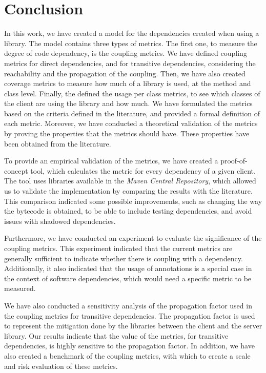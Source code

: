 \chapter{Conclusion}\label{ch:Conclusion}

In this work, we have created a model for the dependencies created when using a library. The model contains three types of metrics. The first one, to measure the degree of code dependency, is the coupling metrics. We have defined coupling metrics for direct dependencies, and for transitive dependencies, considering the reachability and the propagation of the coupling. Then, we have also created coverage metrics to measure how much of a library is used, at the method and class level. Finally, the defined the usage per class metrics, to see which classes of the client are using the library and how much. We have formulated the metrics based on the criteria defined in the literature, and provided a formal definition of each metric. Moreover, we have conducted a theoretical validation of the metrics by proving the properties that the metrics should have. These properties have been obtained from the literature.

To provide an empirical validation of the metrics, we have created a proof-of-concept tool, which calculates the metric for every dependency of a given client. The tool uses libraries available in the \textit{Maven Central Repository}, which allowed us to validate the implementation by comparing the results with the literature. This comparison indicated some possible improvements, such as changing the way the bytecode is obtained, to be able to include testing dependencies, and avoid issues with shadowed dependencies.

Furthermore, we have conducted an experiment to evaluate the significance of the coupling metrics. This experiment indicated that the current metrics are generally sufficient to indicate whether there is coupling with a dependency. Additionally, it also indicated that the usage of annotations is a special case in the context of software dependencies, which would need a specific metric to be measured.

We have also conducted a sensitivity analysis of the propagation factor used in the coupling metrics for transitive dependencies. The propagation factor is used to represent the mitigation done by the libraries between the client and the server library. Our results indicate that the value of the metrics, for transitive dependencies, is highly sensitive to the propagation factor. In addition, we have also created a benchmark of the coupling metrics, with which to create a scale and risk evaluation of these metrics.

